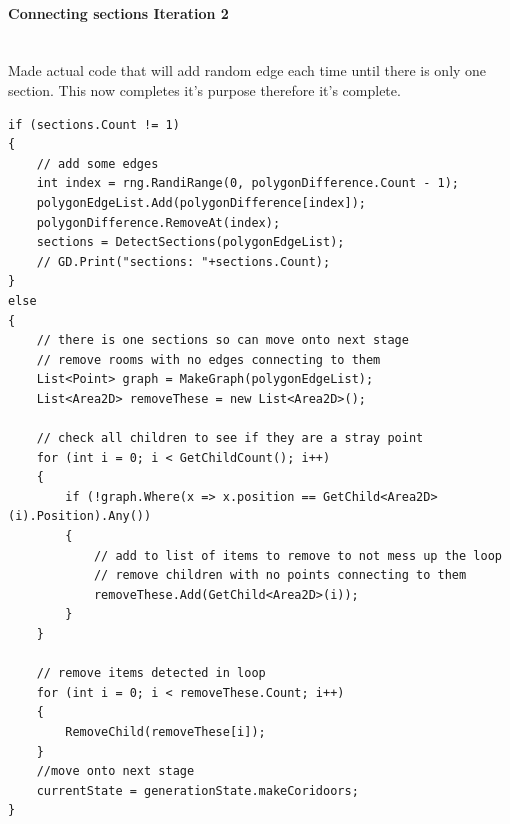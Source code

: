 \documentclass{article}
\newcommand{\myparagraph}[1]{\paragraph{#1}\mbox{}\\} %
\begin{document}
\myparagraph{Connecting sections Iteration 2}
Made actual code that will add random edge each time until there is only one section. This now completes it's purpose therefore it's complete.
\begin{lstlisting}
if (sections.Count != 1)
{
    // add some edges
    int index = rng.RandiRange(0, polygonDifference.Count - 1);
    polygonEdgeList.Add(polygonDifference[index]);
    polygonDifference.RemoveAt(index);
    sections = DetectSections(polygonEdgeList);
    // GD.Print("sections: "+sections.Count);
}
else
{
	// there is one sections so can move onto next stage
    // remove rooms with no edges connecting to them
    List<Point> graph = MakeGraph(polygonEdgeList);
    List<Area2D> removeThese = new List<Area2D>();

    // check all children to see if they are a stray point
    for (int i = 0; i < GetChildCount(); i++)
    {
        if (!graph.Where(x => x.position == GetChild<Area2D>(i).Position).Any())
        {
            // add to list of items to remove to not mess up the loop
            // remove children with no points connecting to them
            removeThese.Add(GetChild<Area2D>(i));
        }
    }

    // remove items detected in loop
    for (int i = 0; i < removeThese.Count; i++)
    {
        RemoveChild(removeThese[i]);
    }
	//move onto next stage
    currentState = generationState.makeCoridoors;
}
\end{lstlisting}
\end{document}
